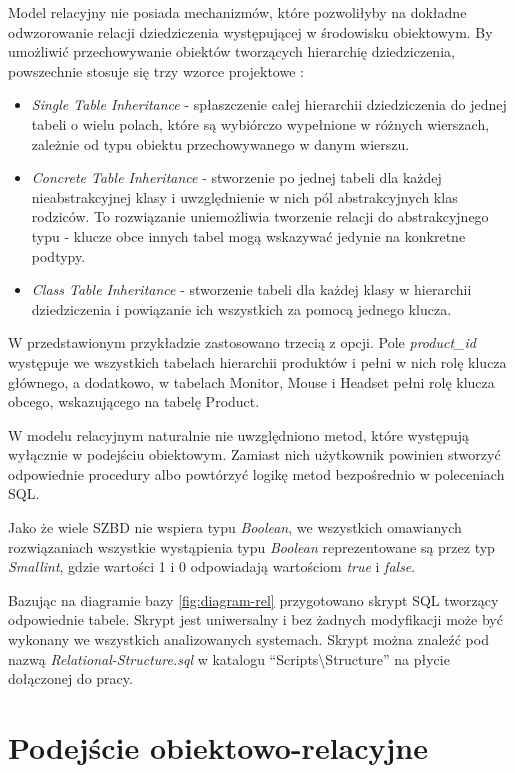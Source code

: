 \documentclass[a4paper,twoside,12pt]{book}
\begin{document}
Model relacyjny nie posiada mechanizmów, które pozwoliłyby na dokładne odwzorowanie relacji dziedziczenia występującej w środowisku obiektowym. By umożliwić przechowywanie obiektów tworzących hierarchię dziedziczenia, powszechnie stosuje się trzy wzorce projektowe \cite{bib:fowler-patterns-of-enterprise-application-architecture}: 
\begin{itemize}
\item \textit{Single Table Inheritance} - spłaszczenie całej hierarchii dziedziczenia do jednej tabeli o wielu polach, które są wybiórczo wypełnione w różnych wierszach, zależnie od typu obiektu przechowywanego w danym wierszu.
\item \textit{Concrete Table Inheritance} - stworzenie po jednej tabeli dla każdej nieabstrakcyjnej klasy i uwzględnienie w nich pól abstrakcyjnych klas rodziców. To rozwiązanie uniemożliwia tworzenie relacji do abstrakcyjnego typu - klucze obce innych tabel mogą wskazywać jedynie na konkretne podtypy.
\item \textit{Class Table Inheritance} - stworzenie tabeli dla każdej klasy w hierarchii dziedziczenia i powiązanie ich wszystkich za pomocą jednego klucza.
\end{itemize}

W przedstawionym przykładzie zastosowano trzecią z opcji. Pole \textit{product\_id} występuje we wszystkich tabelach hierarchii produktów i pełni w nich rolę klucza głównego, a dodatkowo, w tabelach Monitor, Mouse i Headset pełni rolę klucza obcego, wskazującego na tabelę Product.

W modelu relacyjnym naturalnie nie uwzględniono metod, które występują wyłącznie w podejściu obiektowym. Zamiast nich użytkownik powinien stworzyć odpowiednie procedury albo powtórzyć logikę metod bezpośrednio w poleceniach SQL.

Jako że wiele SZBD nie wspiera typu \textit{Boolean}, we wszystkich omawianych rozwiązaniach wszystkie wystąpienia typu \textit{Boolean} reprezentowane są przez typ \textit{Smallint}, gdzie wartości 1 i 0 odpowiadają wartościom \textit{true} i \textit{
false}.

Bazując na diagramie bazy \ref{fig:diagram-rel} przygotowano skrypt SQL tworzący odpowiednie tabele. Skrypt jest uniwersalny i bez żadnych modyfikacji może być wykonany we wszystkich analizowanych systemach. Skrypt można znaleźć pod nazwą \textit{Relational-Structure.sql} w katalogu ``Scripts\textbackslash Structure'' na płycie dołączonej do pracy.

\section{Podejście obiektowo-relacyjne}
\end{document}
